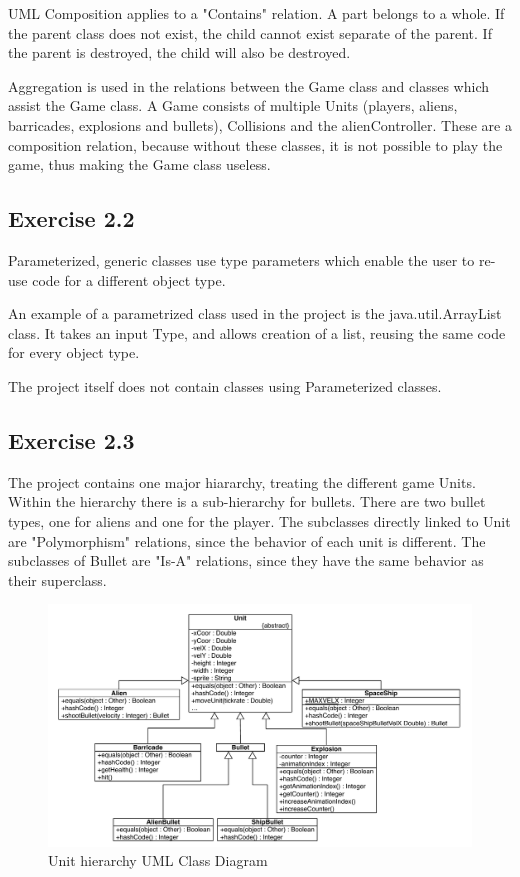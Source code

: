\documentclass[10pt]{article}
\begin{document}
UML Composition applies to a "Contains" relation.
A part belongs to a whole. If the parent class does not exist, the child cannot exist separate of the parent. 
If the parent is destroyed, the child will also be destroyed.

Aggregation is used in the relations between the Game class and classes which assist the Game class.
A Game consists of multiple Units (players, aliens, barricades, explosions and bullets), Collisions and the alienController. These are a composition relation, because without these classes, it is not possible to play the game, thus making the Game class useless.

\subsection{Exercise  2.2}
Parameterized, generic classes use type parameters which enable the user to re-use code for a different object type. 

An example of a parametrized class used in the project is the java.util.ArrayList class.
It takes an input Type, and allows creation of a list, reusing the same code for every object type.

The project itself does not contain classes using Parameterized classes.
\pagebreak
\subsection{Exercise  2.3}
The project contains one major hiararchy, treating the different game Units. 
Within the hierarchy there is a sub-hierarchy for bullets. There are two bullet types, one for aliens and one for the player.
The subclasses directly linked to Unit are "Polymorphism" relations, since the behavior of each unit is different.
The subclasses of Bullet are "Is-A" relations, since they have the same behavior as their superclass.

\begin{figure}[ht!]
\includegraphics[width=1.1\textwidth]{SI-UMLhierarchies.pdf}
\caption{Unit hierarchy UML Class Diagram}
\end{figure}
\end{document}
